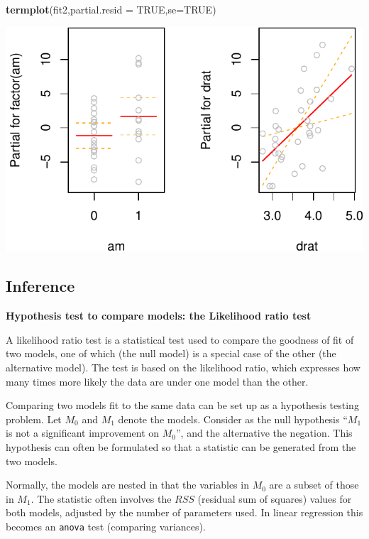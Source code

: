 \documentclass[]{article}
\newenvironment{Shaded}{\begin{snugshade}}{\end{snugshade}}
\newcommand{\KeywordTok}[1]{\textcolor[rgb]{0.13,0.29,0.53}{\textbf{{#1}}}}
\newcommand{\DataTypeTok}[1]{\textcolor[rgb]{0.13,0.29,0.53}{{#1}}}
\newcommand{\OtherTok}[1]{\textcolor[rgb]{0.56,0.35,0.01}{{#1}}}
\newcommand{\NormalTok}[1]{{#1}}
\numberwithin{equation}{section}
\begin{document}
\begin{Shaded}
\begin{Highlighting}[]
\KeywordTok{termplot}\NormalTok{(fit2,}\DataTypeTok{partial.resid =} \OtherTok{TRUE}\NormalTok{,}\DataTypeTok{se=}\OtherTok{TRUE}\NormalTok{)}
\end{Highlighting}
\end{Shaded}

\includegraphics{index_files/figure-latex/unnamed-chunk-220-2.pdf}

\subsection{Inference}\label{inference}

\textbf{Hypothesis test to compare models: the Likelihood ratio test}

A likelihood ratio test is a statistical test used to compare the
goodness of fit of two models, one of which (the null model) is a
special case of the other (the alternative model). The test is based on
the likelihood ratio, which expresses how many times more likely the
data are under one model than the other.

Comparing two models fit to the same data can be set up as a hypothesis
testing problem. Let \(M_0\) and \(M_1\) denote the models. Consider as
the null hypothesis ``\(M_1\) is not a significant improvement on
\(M_0\)'', and the alternative the negation. This hypothesis can often
be formulated so that a statistic can be generated from the two models.

Normally, the models are nested in that the variables in \(M_0\) are a
subset of those in \(M_1\). The statistic often involves the \(RSS\)
(residual sum of squares) values for both models, adjusted by the number
of parameters used. In linear regression this becomes an \texttt{anova}
test (comparing variances).
\end{document}

